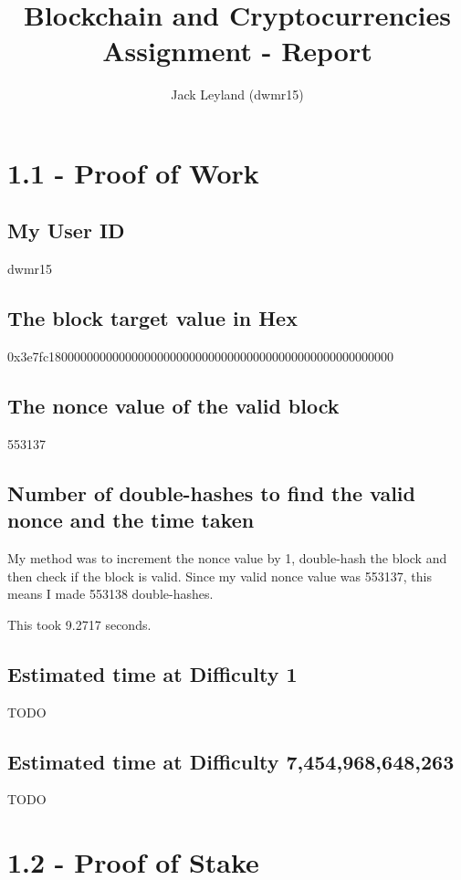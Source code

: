 \documentclass[11pt]{article}
\begin{document}
	
	\title{Blockchain and Cryptocurrencies Assignment - Report}
	\author{Jack Leyland (dwmr15)}
	
	\maketitle
	
	\section*{1.1 - Proof of Work}
	\subsection*{My User ID}
	dwmr15
	
	\subsection*{The block target value in Hex}
	0x3e7fc180000000000000000000000000000000000000000000000000000
	
	\subsection*{The nonce value of the valid block}
	553137
	
	\subsection*{Number of double-hashes to find the valid nonce and the time taken}
	My method was to increment the nonce value by 1, double-hash the block and then check if the block is valid. Since my valid nonce value was 553137, this means I made 553138 double-hashes. 
	
	This took 9.2717 seconds.
	
	\subsection*{Estimated time at Difficulty 1}
	TODO
	
	\subsection*{Estimated time at Difficulty 7,454,968,648,263}
	TODO
	
	\newpage
	
	
	\section*{1.2 - Proof of Stake}
\end{document}
